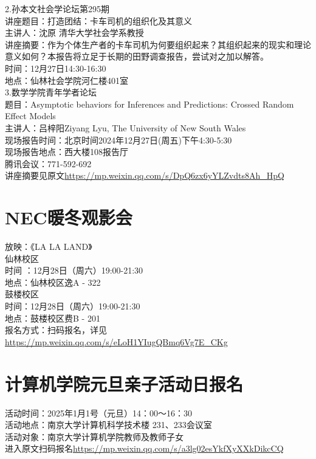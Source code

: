 \documentclass[letterpaper, 12pt]{article}
\begin{document}
\begin{multicols}{2}
2.孙本文社会学论坛第295期\\
讲座题目：打造团结：卡车司机的组织化及其意义\\
主讲人：沈原 清华大学社会学系教授\\
讲座摘要：作为个体生产者的卡车司机为何要组织起来？其组织起来的现实和理论意义如何？本报告将立足于长期的田野调查报告，尝试对之加以解答。\\
时间：12月27日14:30-16:30\\
地点：仙林社会学院河仁楼401室\\


3.数学学院青年学者论坛\\
题目：Asymptotic behaviors for Inferences and Predictions: Crossed Random Effect Models\\
主讲人：吕梓阳Ziyang Lyu, The University of New South Wales\\
现场报告时间：北京时间2024年12月27日(周五)下午4:30-5:30\\
现场报告地点：西大楼108报告厅\\
腾讯会议：771-592-692\\
讲座摘要见原文\url{https://mp.weixin.qq.com/s/DpQ6zx6yYLZvdts8Ah_HpQ}\\




\section{NEC暖冬观影会}
放映：《LA LA LAND》\\
仙林校区\\
时间 ：12月28日（周六）19:00-21:30\\
地点：仙林校区逸A - 322\\
鼓楼校区\\
时间：12月28日（周六）19:00-21:30\\
地点：鼓楼校区费B - 201\\
报名方式：扫码报名，详见\url{https://mp.weixin.qq.com/s/eLoH1YIugQBmq6Vg7E_CKg}

\section{计算机学院元旦亲子活动日报名}
活动时间：2025年1月1号（元旦）14：00～16：30\\
活动地点：南京大学计算机科学技术楼 231、233会议室\\
活动对象：南京大学计算机学院教师及教师子女\\
进入原文扫码报名\url{https://mp.weixin.qq.com/s/a3lg02esYkfXyXXkDikcCQ}\\



\end{multicols}
\end{document}
